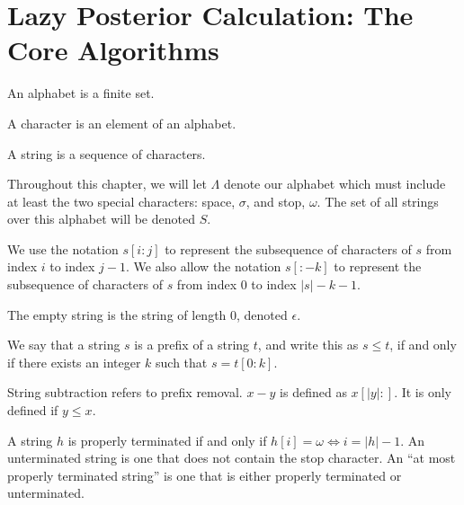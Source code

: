 \section{Lazy Posterior Calculation: The Core Algorithms}
\label{sec:core-algorithms}

\begin{definition}[Alphabet]
An alphabet is a finite set.
\end{definition}

\begin{definition}[Character]
A character is an element of an alphabet.
\end{definition}

\begin{definition}[String]
A string is a sequence of characters.
\end{definition}

Throughout this chapter, we will let $\Lambda$ denote our alphabet which must include at least
the two special characters: space, $\sigma$, and stop, $\omega$.
The set of all strings over
this alphabet will be denoted $S$.

\begin{definition}[Substring]
We use the notation $s[i:j]$ to represent the subsequence of characters of $s$ from index $i$ to index $j-1$.
We also allow the notation $s[:-k]$ to represent the subsequence of characters of $s$ from index 0 to index $|s|-k-1$.
\end{definition}

\begin{definition}
    The empty string is the string of length 0, denoted $\epsilon$.
\end{definition}

\begin{definition}
We say that a string $s$ is a prefix of a string $t$, and write this as $s \leq t$, if and only if there exists an integer $k$ such that $s = t[0:k]$.
\end{definition}

\begin{definition}
\label{def:string-subtraction}
    String subtraction refers to prefix removal.
    $x - y$ is defined as $x[|y|:]$.
    It is only defined if $y \leq x$.
\end{definition}

\begin{definition}
A string $h$ is properly terminated if and only if $h[i]=\omega \iff i=|h|-1$.
An unterminated string is one that does not contain the stop character.
An ``at most properly terminated string'' is one that is either properly terminated or unterminated.
\end{definition}

